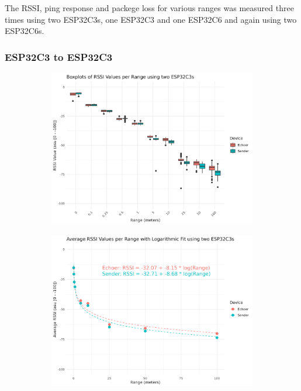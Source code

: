 The RSSI, ping response and packege loss for various ranges was measured three times using two ESP32C3s, one ESP32C3 and one ESP32C6 and again using two ESP32C6s.

\subsubsection{ESP32C3 to ESP32C3}

\begin{figure}[H]
    \centering
    \begin{subfigure}{0.45\textwidth}
        \includegraphics[width=\linewidth]{rstudio/analysis/plots/ESP32C3_rssi_box.png}
    \end{subfigure}
    \begin{subfigure}{0.45\textwidth}
        \includegraphics[width=\linewidth]{rstudio/analysis/plots/ESP32C3_avg_rssi.png}
    \end{subfigure}


\end{figure}
